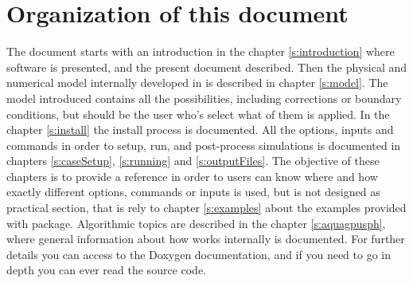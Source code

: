 \section{Organization of this document}
%
The document starts with an introduction in the chapter \ref{s:introduction} where \NAME
software is presented, and the present document described.\rc
%
Then the physical and numerical model internally developed in \NAME is described in chapter
\ref{s:model}. The model introduced contains all the possibilities, including corrections
or boundary conditions, but should be the user who's select what of them is applied.\rc
%
In the chapter \ref{s:install} the \NAME install process is documented.\rc
%
All the options, inputs and commands in order to setup, run, and post-process simulations is
documented in chapters \ref{s:caseSetup}, \ref{s:running} and \ref{s:outputFiles}. The
objective of these chapters is to provide a reference in order to users can know where and
how exactly different options, commands or inputs is used, but is not designed as practical
section, that is rely to chapter \ref{s:examples} about the examples provided with \NAME
package.\rc
%
Algorithmic topics are described in the chapter \ref{s:aquagpusph}, where general information
about how \NAME works internally is documented. For further details you can access to the
Doxygen documentation, and if you need to go in depth you can ever read the source code.
%